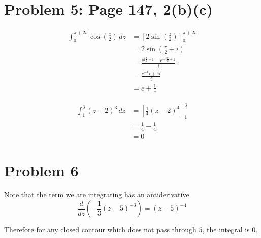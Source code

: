 \documentclass{article}
\begin{document}
\section*{Problem 5: Page 147, 2(b)(c)}
\begin{align*}
	\int_0^{\pi+2i} \cos\left(\frac{z}{2}\right) \,dz 
	&= \left[2\sin\left(\frac{z}{2}\right)\right]_0^{\pi+2i}\\
	&= 2\sin\left(\frac{\pi}{2} + i\right) \\
	&= \frac{e^{i\frac{\pi}{2}-1} - e^{-i\frac{\pi}{2}+1}}{i} \\
	&= \frac{e^{-1}i + ei}{i} \\
	&= e + \frac{1}{e}
\end{align*}

\begin{align*}
	\int_1^3 (z-2)^3 \,dz 
	&= \left[\frac{1}{4}(z-2)^4\right]_1^3 \\
	&= \frac{1}{4} - \frac{1}{4} \\
	&= 0
\end{align*}
\newpage  

\section*{Problem 6}
Note that the term we are integrating has an antiderivative.
\[
	\frac{d}{dz} \left(-\frac{1}{3}(z-5)^{-3}\right) = (z-5)^{-4}
\]

Therefore for any closed contour which does not pass through $5$,
the integral is $0$.
\end{document}

